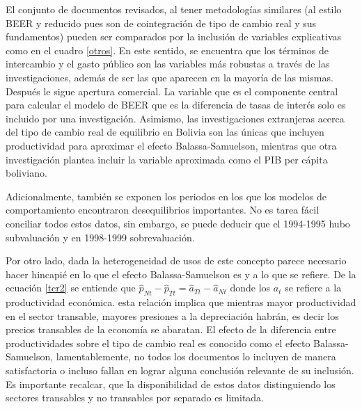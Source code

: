 \documentclass[12pt,letterpaper]{article}
\begin{document}
El conjunto de documentos revisados, al tener metodologías similares (al estilo BEER y reducido pues son de cointegración de tipo de cambio real y sus fundamentos) pueden ser comparados por la inclusión de variables explicativas como en el cuadro \ref{otros}. En este sentido, se encuentra que los términos de intercambio y el gasto público son las variables más robustas a través de las investigaciones, además de ser las que aparecen en la mayoría de las mismas. Después le sigue apertura comercial. La variable que es el componente central para calcular el modelo de BEER que es la diferencia de tasas de interés solo es incluido por una investigación. Asimismo, las investigaciones extranjeras acerca del tipo de cambio real de equilibrio en Bolivia son las únicas que incluyen productividad para aproximar el efecto Balassa-Samuelson, mientras que otra investigación plantea incluir la variable aproximada como el PIB per cápita boliviano.

Adicionalmente, también se exponen los periodos en los que los modelos de comportamiento encontraron desequilibrios importantes. No es tarea fácil conciliar todos estos datos, sin embargo, se puede deducir que el 1994-1995 hubo subvaluación y en 1998-1999 sobrevaluación. 

Por otro lado, dada la heterogeneidad de usos de este concepto parece necesario hacer hincapié en lo que el efecto Balassa-Samuelson es y a lo que se refiere. De la ecuación \ref{tcr2} se entiende que $\hat{p}_{Nt}-\hat{p}_{Tt}=\hat{a}_{Tt}-\hat{a}_{Nt}$ donde los $a_t$ se refiere a la productividad económica. esta relación implica que mientras mayor productividad en el sector transable, mayores presiones a la depreciación habrán, es decir los precios transables de la economía se abaratan. El efecto de la diferencia entre productividades sobre el tipo de cambio real es conocido como el efecto Balassa-Samuelson, lamentablemente, no todos los documentos lo incluyen de manera satisfactoria o incluso fallan en lograr alguna conclusión relevante de su inclusión. Es importante recalcar, que la disponibilidad de estos datos distinguiendo los sectores transables y no transables por separado es limitada. 

\end{document}
